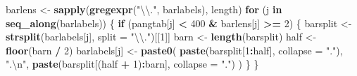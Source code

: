 \documentclass[
]{article}
\newenvironment{Shaded}{\begin{snugshade}}{\end{snugshade}}
\newcommand{\CharTok}[1]{\textcolor[rgb]{0.31,0.60,0.02}{#1}}
\newcommand{\ControlFlowTok}[1]{\textcolor[rgb]{0.13,0.29,0.53}{\textbf{#1}}}
\newcommand{\DataTypeTok}[1]{\textcolor[rgb]{0.13,0.29,0.53}{#1}}
\newcommand{\DecValTok}[1]{\textcolor[rgb]{0.00,0.00,0.81}{#1}}
\newcommand{\KeywordTok}[1]{\textcolor[rgb]{0.13,0.29,0.53}{\textbf{#1}}}
\newcommand{\NormalTok}[1]{#1}
\newcommand{\OperatorTok}[1]{\textcolor[rgb]{0.81,0.36,0.00}{\textbf{#1}}}
\newcommand{\StringTok}[1]{\textcolor[rgb]{0.31,0.60,0.02}{#1}}
\begin{document}
\begin{Shaded}
\begin{Highlighting}[]
\NormalTok{        barlens \textless{}{-}}\StringTok{ }\KeywordTok{sapply}\NormalTok{(}\KeywordTok{gregexpr}\NormalTok{(}\StringTok{"}\CharTok{\textbackslash{}\textbackslash{}}\StringTok{."}\NormalTok{, barlabels), length)}
        \ControlFlowTok{for}\NormalTok{ (j }\ControlFlowTok{in} \KeywordTok{seq\_along}\NormalTok{(barlabels)) \{}
            \ControlFlowTok{if}\NormalTok{ (pangtab[j] }\OperatorTok{\textless{}}\StringTok{ }\DecValTok{400} \OperatorTok{\&}\StringTok{ }\NormalTok{barlens[j] }\OperatorTok{\textgreater{}=}\StringTok{ }\DecValTok{2}\NormalTok{) \{}
\NormalTok{                barsplit \textless{}{-}}\StringTok{ }\KeywordTok{strsplit}\NormalTok{(barlabels[j], }\DataTypeTok{split =} \StringTok{"}\CharTok{\textbackslash{}\textbackslash{}}\StringTok{."}\NormalTok{)[[}\DecValTok{1}\NormalTok{]]}
\NormalTok{                barn \textless{}{-}}\StringTok{ }\KeywordTok{length}\NormalTok{(barsplit)}
\NormalTok{                half \textless{}{-}}\StringTok{ }\KeywordTok{floor}\NormalTok{(barn }\OperatorTok{/}\StringTok{ }\DecValTok{2}\NormalTok{)}
\NormalTok{                barlabels[j] \textless{}{-}}\StringTok{ }\KeywordTok{paste0}\NormalTok{(}
                    \KeywordTok{paste}\NormalTok{(barsplit[}\DecValTok{1}\OperatorTok{:}\NormalTok{half], }\DataTypeTok{collapse =} \StringTok{"."}\NormalTok{),}
                    \StringTok{".}\CharTok{\textbackslash{}n}\StringTok{"}\NormalTok{,}
                    \KeywordTok{paste}\NormalTok{(barsplit[(half }\OperatorTok{+}\StringTok{ }\DecValTok{1}\NormalTok{)}\OperatorTok{:}\NormalTok{barn], }\DataTypeTok{collapse =} \StringTok{"."}\NormalTok{)}
\NormalTok{                )}
\NormalTok{            \}}
\NormalTok{        \}}


\end{Highlighting}
\end{Shaded}
\end{document}
